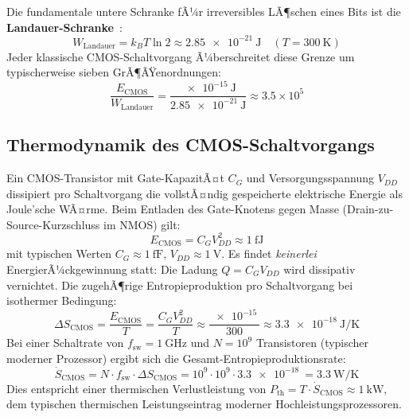 ﻿\documentclass[12pt, a4paper]{report}
\theoremstyle{definition}
\theoremstyle{remark}
\begin{document}
Die fundamentale untere Schranke fÃ¼r irreversibles LÃ¶schen eines Bits ist
die \textbf{Landauer-Schranke}~\cite{landauer1961}:
\begin{equation}
  W_\text{Landauer} = k_B T \ln 2
  \approx \SI{2.85e-21}{\joule}
  \quad (T = \SI{300}{\kelvin})
  \label{eq:landauer}
\end{equation}
Jeder klassische CMOS-Schaltvorgang Ã¼berschreitet diese Grenze um typischerweise
sieben GrÃ¶ÃŸenordnungen:
\begin{equation}
  \frac{E_\text{CMOS}}{W_\text{Landauer}}
  = \frac{\SI{e-15}{\joule}}{\SI{2.85e-21}{\joule}}
  \approx 3.5 \times 10^5
  \label{eq:cmos_landauer_ratio}
\end{equation}

\subsection{Thermodynamik des CMOS-Schaltvorgangs}

Ein CMOS-Transistor mit Gate-KapazitÃ¤t $C_G$ und Versorgungsspannung $V_{DD}$
dissipiert pro Schaltvorgang die vollstÃ¤ndig gespeicherte elektrische Energie
als Joule'sche WÃ¤rme. Beim Entladen des Gate-Knotens gegen Masse
(Drain-zu-Source-Kurzschluss im NMOS) gilt:
\begin{equation}
  E_\text{CMOS} = C_G V_{DD}^2
  \approx \SI{1}{\femto\joule}
  \label{eq:e_cmos}
\end{equation}
mit typischen Werten $C_G \approx \SI{1}{\femto\farad}$,
$V_{DD} \approx \SI{1}{\volt}$.
Es findet \emph{keinerlei} EnergierÃ¼ckgewinnung statt: Die Ladung
$Q = C_G V_{DD}$ wird dissipativ vernichtet. Die zugehÃ¶rige Entropieproduktion
pro Schaltvorgang bei isothermer Bedingung:
\begin{equation}
  \Delta S_\text{CMOS}
  = \frac{E_\text{CMOS}}{T}
  = \frac{C_G V_{DD}^2}{T}
  \approx \frac{\SI{e-15}{}}{300}
  \approx \SI{3.3e-18}{\joule\per\kelvin}
  \label{eq:ds_cmos}
\end{equation}
Bei einer Schaltrate von $f_\text{sw} = \SI{1}{\giga\hertz}$ und
$N = 10^9$ Transistoren (typischer moderner Prozessor) ergibt sich die
Gesamt-Entropieproduktionsrate:
\begin{equation}
  \dot{S}_\text{CMOS}
  = N \cdot f_\text{sw} \cdot \Delta S_\text{CMOS}
  = 10^9 \cdot 10^9 \cdot \SI{3.3e-18}{}
  = \SI{3.3}{\watt\per\kelvin}
  \label{eq:sdot_cmos}
\end{equation}
Dies entspricht einer thermischen Verlustleistung von
$P_\text{th} = T \cdot \dot{S}_\text{CMOS} \approx \SI{1}{\kilo\watt}$,
dem typischen thermischen Leistungseintrag moderner Hochleistungsprozessoren.
\end{document}
